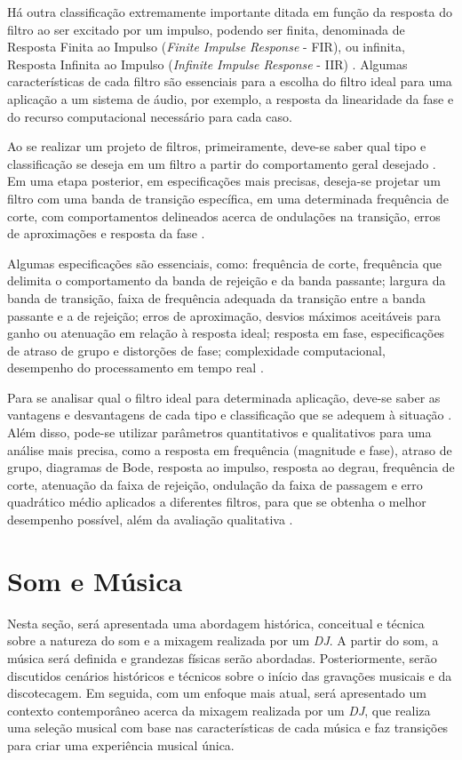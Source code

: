 Há outra classificação extremamente importante ditada em função da resposta do filtro ao ser excitado por um impulso, podendo ser finita, denominada de Resposta Finita ao Impulso (\textit{Finite Impulse Response} - FIR), ou infinita, Resposta Infinita ao Impulso (\textit{Infinite Impulse Response} - IIR) \cite{oppenheim2013processamento}. Algumas características de cada filtro são essenciais para a escolha do filtro ideal para uma aplicação a um sistema de áudio, por exemplo, a resposta da linearidade da fase e do recurso computacional necessário para cada caso.

Ao se realizar um projeto de filtros, primeiramente, deve-se saber qual tipo e classificação se deseja em um filtro a partir do comportamento geral desejado \cite{oppenheim2013processamento}. Em uma etapa posterior, em especificações mais precisas, deseja-se projetar um filtro com uma banda de transição específica, em uma determinada frequência de corte, com comportamentos delineados acerca de ondulações na transição, erros de aproximações e resposta da fase \cite{oppenheim2013processamento}.

Algumas especificações são essenciais, como: frequência de corte, frequência que delimita o comportamento da banda de rejeição e da banda passante; largura da banda de transição, faixa de frequência adequada da transição entre a banda passante e a de rejeição; erros de aproximação, desvios máximos aceitáveis para ganho ou atenuação em relação à resposta ideal; resposta em fase, especificações de atraso de grupo e distorções de fase; complexidade computacional, desempenho do processamento em tempo real \cite{oppenheim2013processamento}.

Para se analisar qual o filtro ideal para determinada aplicação, deve-se saber as vantagens e desvantagens de cada tipo e classificação que se adequem à situação \cite{oppenheim2013processamento}. Além disso, pode-se utilizar parâmetros quantitativos e qualitativos para uma análise mais precisa, como a resposta em frequência (magnitude e fase), atraso de grupo, diagramas de Bode, resposta ao impulso, resposta ao degrau, frequência de corte, atenuação da faixa de rejeição, ondulação da faixa de passagem e erro quadrático médio aplicados a diferentes filtros, para que se obtenha o melhor desempenho possível, além da avaliação qualitativa \cite{oppenheim2013processamento}.

\section{Som e Música}
Nesta seção, será apresentada uma abordagem histórica, conceitual e técnica sobre a natureza do som e a mixagem realizada por um \textit{DJ}. A partir do som, a música será definida e grandezas físicas serão abordadas. Posteriormente, serão discutidos cenários históricos e técnicos sobre o início das gravações musicais e da discotecagem. Em seguida, com um enfoque mais atual, será apresentado um contexto contemporâneo acerca da mixagem realizada por um \textit{DJ}, que realiza uma seleção musical com base nas características de cada música e faz transições para criar uma experiência musical única.

